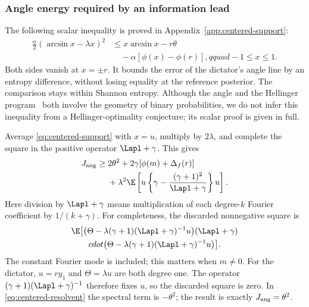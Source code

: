 \subsubsection{Angle energy required by an information lead}

The following scalar inequality is proved in
Appendix~\ref{app:centered-support}:
\begin{equation}
 \begin{split}
 \frac{\alpha}{2}(\arcsin x-\lambda x)^2
 &\le x\arcsin x-r\theta\\
 &\quad-\alpha[\phi(x)-\phi(r)],qquad -1\le x\le1.
 \end{split}
 \label{eq:centered-support}
\end{equation}
Both sides vanish at \(x=\pm r\). It bounds the error of the
dictator's angle line by an entropy difference, without losing
equality at the reference posterior.
The comparison stays within Shannon entropy. Although the angle and
the Hellinger program~\cite{Hellinger,CN} both involve the geometry of
binary probabilities, we do not infer this inequality from a
Hellinger-optimality conjecture; its scalar proof is given in full.

Average \eqref{eq:centered-support} with \(x=u\), multiply by
\(2\lambda\), and complete the square in the positive operator
\(\Lapl+\gamma\). This gives
\begin{equation}
 \begin{split}
 J_{\rm ang}\ge{}&2\theta^2+2\gamma[\phi(m)+\Delta_f(r)]\\
 &+\lambda^2\E\left[u\left\{\gamma-
       \frac{(\gamma+1)^2}{\Lapl+\gamma}\right\}u\right].
 \end{split}
 \label{eq:centered-resolvent}
\end{equation}
Here division by \(\Lapl+\gamma\) means multiplication of each
degree-\(k\) Fourier coefficient by \(1/(k+\gamma)\).
For completeness, the discarded nonnegative square is
\begin{multline*}
 \E\bigl[
 \bigl(\Theta-\lambda(\gamma+1)(\Lapl+\gamma)^{-1}u\bigr)
 (\Lapl+\gamma)\\
 {}cdot\bigl(\Theta-\lambda(\gamma+1)
 (\Lapl+\gamma)^{-1}u\bigr)\bigr].
\end{multline*}
The constant Fourier mode is included; this matters when \(m\ne0\).
For the dictator, \(u=ry_1\) and \(\Theta=\lambda u\) are both
degree one. The operator \((\gamma+1)(\Lapl+\gamma)^{-1}\)
therefore fixes \(u\), so the discarded square is zero. In
\eqref{eq:centered-resolvent} the spectral term is \(-\theta^2\);
the result is exactly \(J_{\rm ang}=\theta^2\).

